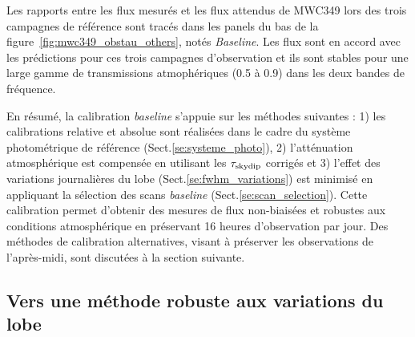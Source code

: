 Les rapports entre les flux mesurés et les flux attendus de MWC349
lors des trois campagnes de référence sont tracés dans les panels du
bas de la figure~\ref{fig:mwc349_obstau_others}, notés
\emph{Baseline}. Les flux sont en accord avec les prédictions pour ces
trois campagnes d'observation et ils sont stables pour une large gamme de
transmissions atmophériques (0.5 à 0.9) dans les deux bandes de
fréquence.

En résumé, la calibration \emph{baseline} s'appuie sur les
méthodes suivantes : 1) les calibrations relative et absolue sont
réalisées dans le cadre du système photométrique de référence
(Sect.\ref{se:systeme_photo}), 2) l'atténuation atmosphérique est
compensée en utilisant les $\tau_{\rm{skydip}}$ corrigés et 3) l'effet
des variations journalières du lobe (Sect.\ref{se:fwhm_variations})
est minimisé en appliquant la sélection des scans \emph{baseline}
(Sect.\ref{se:scan_selection}). Cette calibration permet d'obtenir des
mesures de flux non-biaisées et robustes aux conditions atmosphérique
en préservant 16 heures d'observation par jour. Des méthodes de
calibration alternatives, visant à préserver les observations de
l'après-midi, sont discutées à la section suivante.

\subsection{Vers une méthode robuste aux variations du lobe}
\label{se:afternoon_calibration}

